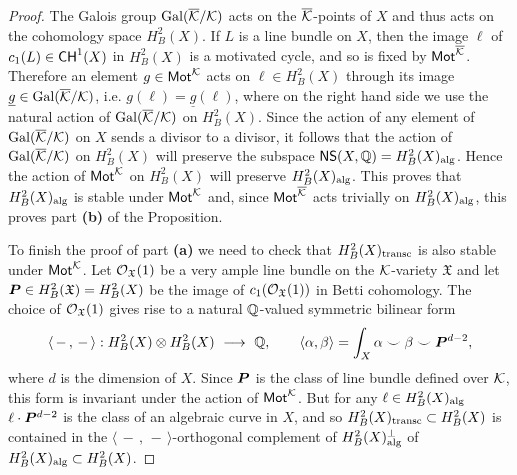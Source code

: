 \documentclass[twoside,leqno]{article}
\numberwithin{equation}{section}
\theoremstyle{plain}
\theoremstyle{definition}
\begin{document}
\begin{proof}  The Galois group $\operatorname{Gal}(\overline{\mathcal K}/\mathcal K)$ acts on the $\overline{\mathcal K}$-points of $X$ and thus acts on the 
cohomology space $H^{2}_{B}(X)$. 
If $L$ is a line bundle on $X$, then the image  $\ell$ of $c_{1}(L) \in \mathsf{CH}^{1}(X)$ in $H^{2}_{B}(X)$ is a motivated cycle, and so is fixed by $\mathsf{Mot}^{\overline{\mathcal K}}$. Therefore an element $g \in \mathsf{Mot}^{\mathcal K}$ acts on $\ell  \in H^{2}_{B}(X)$ through its image $\underline{g} \in \operatorname{Gal}(\overline{\mathcal K}/\mathcal K)$, i.e. $g(\ell) = \underline{g}(\ell)$, where on the right hand side we use the natural action of  $\operatorname{Gal}(\overline{\mathcal K}/\mathcal K)$ on $H^{2}_{B}(X)$. 
Since the action of any element of $\operatorname{Gal}(\overline{\mathcal K}/\mathcal K)$  on $X$ sends a divisor to a divisor, it follows that 
the action of $\operatorname{Gal}(\overline{\mathcal K}/\mathcal K)$  on $H^{2}_{B}(X)$ will preserve the subspace $\mathsf{NS}(X,\mathbb Q) = H^{2}_{B}(X)_{\operatorname{alg}}$. Hence the action of $\mathsf{Mot}^{\mathcal K}$ on $H^{2}_{B}(X)$ will preserve $H^{2}_{B}(X)_{\operatorname{alg}}$. This proves that $H^{2}_{B}(X)_{\operatorname{alg}}$ is stable under $\mathsf{Mot}^{\mathcal K}$ and, since $\mathsf{Mot}^{\overline{\mathcal K}}$ acts trivially on $H^{2}_{B}(X)_{\operatorname{alg}}$, this proves part  {\bfseries (b)} of the Proposition. 

To finish the proof of part {\bfseries (a)} we need to check that $H^{2}_{B}(X)_{\operatorname{transc}}$ is also stable under $\mathsf{Mot}^{\mathcal K}$.  Let $\mathcal O_{\mathfrak{X}}(1)$ be a very ample line bundle on the
$\mathcal K$-variety $\mathfrak{X}$ and let 
$\boldsymbol{P} \in
H^{2}_{B}(\mathfrak{X}) = H^{2}_{B}(X)$ be the image of $c_{1}(\mathcal O_{\mathfrak{X}}(1))$ in Betti
cohomology.
The choice of $\mathcal O_{\mathfrak{X}}(1)$  gives rise to a natural $\mathbb Q$-valued symmetric bilinear
form
\[
\langle \, - \, ,\,  - \, \rangle : H^{2}_{B}(X)\otimes H^{2}_{B}(X) \
\longrightarrow \ \mathbb Q, \qquad 
\langle \alpha,\beta \rangle = \int_{X} \alpha \smile \beta \smile \boldsymbol{P}^{d-2},
\]
where $d$ is the dimension of $X$. 
Since $\boldsymbol{P}$ is the class of line bundle defined over $\mathcal K$, this form is
invariant under the action of $\mathsf{Mot}^{\mathcal K}$. But for any $\ell \in H^{2}_{B}(X)_{\operatorname{alg}}$
$\ell\cdot \boldsymbol{P}^{d-2}$ is the class of an algebraic curve in $X$, and so $H^{2}_{B}(X)_{\operatorname{transc}} \subset H^{2}_{B}(X)$ is contained in the $\langle \, - \, ,\,  - \, \rangle$-orthogonal complement of $H^{2}_{B}(X)_{\operatorname{alg}}^{\perp}$ of  $H^{2}_{B}(X)_{\operatorname{alg}} \subset H^{2}_{B}(X)$.


\end{proof}
\end{document}
